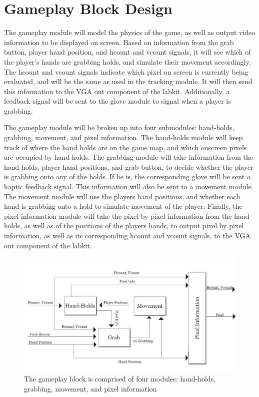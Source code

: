 \section{Gameplay Block Design}
\label{sec:game}

The gameplay module will model the physics of the game, as well as output video information to be displayed on screen. Based on information from the grab button, player hand position, and hcount and vcount signals, it will see which of the player's hands are grabbing holds, and simulate their movement accordingly. The hcount and vcount signals indicate which pixel on screen is currently being evaluated, and will be the same as used in the tracking module. It will then send this information to the VGA out component of the labkit. Additionally, a feedback signal will be sent to the glove module to signal when a player is grabbing. 

The gameplay module will be broken up into four submodules: hand-holds, grabbing, movement, and pixel information.  The hand-holds module will keep track of where the hand holds are on the game map, and which onscreen pixels are occupied by hand holds. The grabbing module will take information from the hand holds, player hand positions, and grab button, to decide whether the player is grabbing onto any of the holds. If he is, the corresponding glove will be sent a haptic feedback signal.  This information will also be sent to a movement module. The movement module will use the players hand positions, and whether each hand is grabbing onto a hold to simulate movement of the player. Finally, the pixel information module will take the pixel by pixel information from the hand holds, as well as of the positions of the players hands, to output pixel by pixel information, as well as its corresponding hcount and vcount signals, to the VGA out component of the labkit.

\begin{figure}[h]
\centering
\includegraphics[width=6.5in]{img/gameplay.png}
\caption{The gameplay block is comprised of four modules: hand-holds, grabbing, movement, and pixel information}
\label{fig:gameplay block}
\end{figure}

